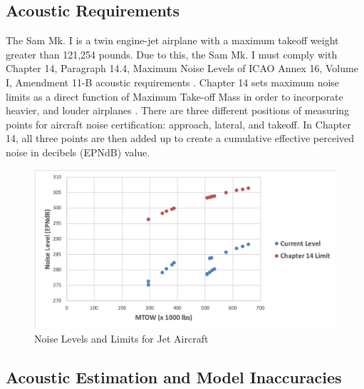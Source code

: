 \subsection{Acoustic Requirements}
The Sam Mk. I is a twin engine-jet airplane with a maximum takeoff weight greater than 121,254 pounds. Due to this, the Sam Mk. I must comply with Chapter 14, Paragraph 14.4, Maximum Noise Levels of ICAO Annex 16, Volume I, Amendment 11-B acoustic requirements \cite{noise_14}. Chapter 14 sets maximum noise limits as a direct function of Maximum Take-off Mass in order to incorporate heavier, and louder airplanes \cite{noise_14}. There are three different positions of measuring points for aircraft noise certification: approach, lateral, and takeoff. In Chapter 14, all three points are then added up to create a cumulative effective perceived noise in decibels (EPNdB) value.    



\begin{figure}[H]
    \centering
    \includegraphics[width=\linewidth]{Photos/Noise_limits.png}
    \caption{Noise Levels and Limits for Jet Aircraft}
    \label{fignoise}
\end{figure}

\subsection{Acoustic Estimation and Model Inaccuracies} 




